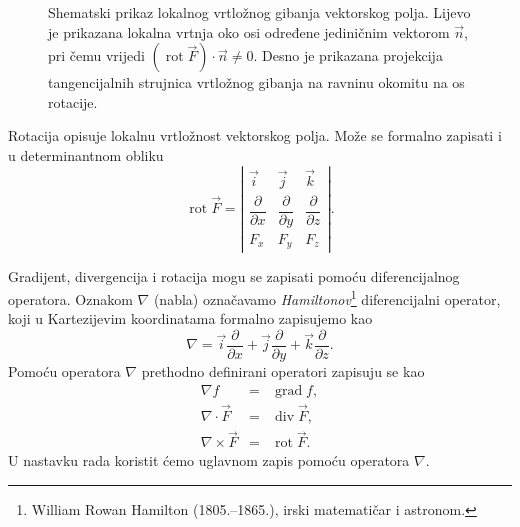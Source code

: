 \documentclass[12pt,a4paper]{article}
\begin{document}
\begin{figure}[H]
\caption{Shematski prikaz lokalnog vrtložnog gibanja vektorskog polja. Lijevo je prikazana lokalna vrtnja oko osi određene jediničnim vektorom $\overrightarrow{n}$, pri čemu vrijedi $(\operatorname{rot} \overrightarrow{F})\cdot\overrightarrow{n}\neq 0$. Desno je prikazana projekcija tangencijalnih strujnica vrtložnog gibanja na ravninu okomitu na os rotacije.}
\end{figure}

Rotacija opisuje lokalnu vrtložnost vektorskog polja. Može se formalno
zapisati i u determinantnom obliku
$$
\operatorname{rot}\overrightarrow{F}
=
\left|
\begin{array}{ccc}
\overrightarrow{i} & \overrightarrow{j} & \overrightarrow{k} \\[2mm]
\dfrac{\partial}{\partial x} &
\dfrac{\partial}{\partial y} &
\dfrac{\partial}{\partial z} \\[2mm]
F_x & F_y & F_z
\end{array}
\right|.
$$

Gradijent, divergencija i rotacija mogu se zapisati pomoću
diferencijalnog operatora. Oznakom $\nabla$ (nabla) označavamo
\textit{Hamiltonov}\footnote{William Rowan Hamilton (1805.--1865.), irski matematičar i astronom.} diferencijalni operator, koji u Kartezijevim koordinatama formalno zapisujemo kao
$$
\nabla
=
\overrightarrow{i}\frac{\partial}{\partial x}
+
\overrightarrow{j}\frac{\partial}{\partial y}
+
\overrightarrow{k}\frac{\partial}{\partial z}.
$$
Pomoću operatora $\nabla$ prethodno definirani operatori zapisuju se kao
$$
\begin{array}{lcl}
\nabla f & = & \operatorname{grad}f, \\[2mm]
\nabla\cdot\overrightarrow{F} & = & \operatorname{div}\overrightarrow{F}, \\[2mm]
\nabla\times\overrightarrow{F} & = & \operatorname{rot}\overrightarrow{F}.
\end{array}
$$
U nastavku rada koristit ćemo uglavnom zapis pomoću operatora $\nabla$.
\end{document}
